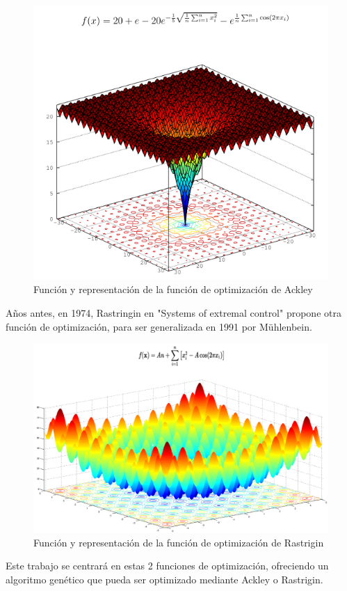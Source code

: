 \bigskip
\begin{figure}[h]
	\centering
	\includegraphics[width=0.7\linewidth]{../images/ackley}
	\caption[Función y representación de la función de optimización de Ackley]{Función y representación de la función de optimización de Ackley}
	\label{fig:ackley}
\end{figure}


\bigskip
Años antes, en 1974, Rastringin en "Systems of extremal control" propone otra función de optimización, para ser generalizada en 1991 por Mühlenbein.

\bigskip
\begin{figure}[h]
	\centering
	\includegraphics[width=0.7\linewidth]{../images/rastrigin}
	\caption[Función y representación de la función de optimización de Rastrigin]{Función y representación de la función de optimización de Rastrigin}
	\label{fig:rastrigin}
\end{figure}

\bigskip
Este trabajo se centrará en estas 2 funciones de optimización, ofreciendo un algoritmo genético que pueda ser optimizado mediante Ackley o Rastrigin.



